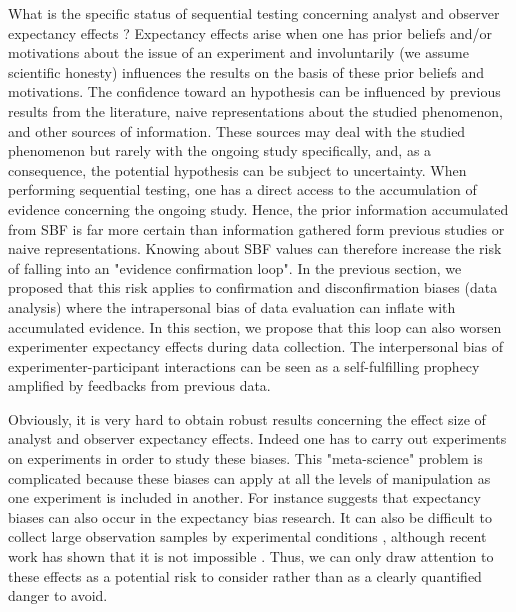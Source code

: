 \documentclass[a4paper,man,natbib,floatsintext,donotrepeattitle]{apa6}
\begin{document}
What is the specific status of sequential testing concerning analyst and observer expectancy effects ? Expectancy effects arise when one has prior beliefs and/or motivations about the issue of an experiment and involuntarily (we assume scientific honesty) influences the results on the basis of these prior beliefs and motivations. The confidence toward an hypothesis can be influenced by previous results from the literature, naive representations about the studied phenomenon, and other sources of information. These sources may deal with the studied phenomenon but rarely with the ongoing study specifically, and, as a consequence, the potential hypothesis can be subject to uncertainty. When performing sequential testing, one has a direct access to the accumulation of evidence concerning the ongoing study. Hence, the prior information accumulated from SBF is far more certain than information gathered form previous studies or naive representations. Knowing about SBF values can therefore increase the risk of falling into an "evidence confirmation loop". In the previous section, we proposed that this risk applies to confirmation and disconfirmation biases (data analysis) where the intrapersonal bias of data evaluation can inflate with accumulated evidence. In this section, we propose that this loop can also worsen experimenter expectancy effects during data collection. The interpersonal bias of experimenter-participant interactions can be seen as a self-fulfilling prophecy amplified by feedbacks from previous data. 

Obviously, it is very hard to obtain robust results concerning the effect size of analyst and observer expectancy effects. Indeed one has to carry out experiments on experiments in order to study these biases. This "meta-science" problem is complicated because these biases can apply at all the levels of manipulation as one experiment is included in another. For instance \cite{barber_expecting_1978} suggests that expectancy biases can also occur in the expectancy bias research. It can also be difficult to collect large observation samples by experimental conditions \citep[e.g.,][]{zoble_interaction_1969}, although recent work has shown that it is not impossible \citep {gilder_role_2018}. Thus, we can only draw attention to these effects as a potential risk to consider rather than as a clearly quantified danger to avoid.
\end{document}
